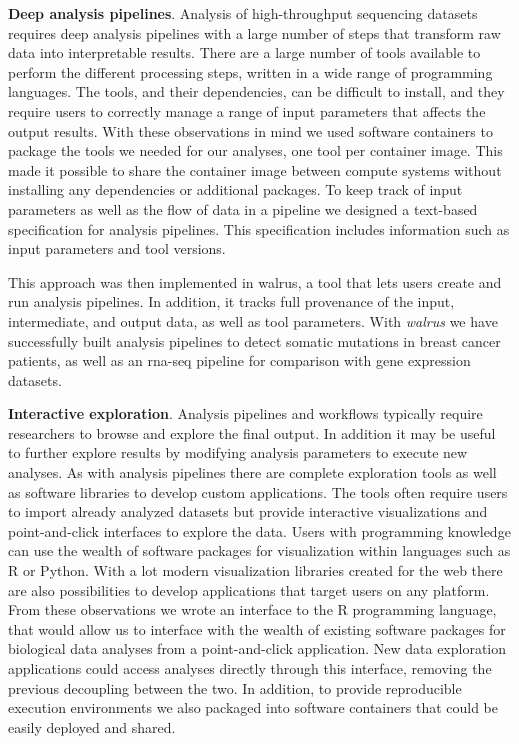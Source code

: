 \textbf{Deep analysis pipelines}. 
Analysis of high-throughput sequencing datasets requires deep analysis pipelines
with a large number of steps that transform raw data into interpretable
results\cite{diao2015building}. There are a large number of tools available to
perform the different processing steps, written in a wide range of programming
languages. The tools, and their dependencies, can be difficult to install, and
they require users to correctly manage a range of input parameters that affects
the output results. With these observations in mind we used software containers
to package the tools we needed for our analyses, one tool per container image.
This made it possible to share the container image between compute systems
without installing any dependencies or additional packages. To keep track of
input parameters as well as the flow of data in a pipeline we designed a
text-based specification for analysis pipelines. This specification includes
information such as input parameters and tool versions. 

This approach was then implemented in walrus, a tool
that lets users create and run analysis pipelines. In addition, it tracks full
provenance of the input, intermediate, and output data, as well as tool
parameters. With \emph{walrus} we have successfully built analysis pipelines to
detect somatic mutations in breast cancer patients, as well as an \gls{rna}-seq
pipeline for comparison with gene expression datasets. 

\textbf{Interactive exploration}. Analysis pipelines and workflows typically
require researchers to browse and explore the final output. In addition it may
be useful to further explore results by modifying analysis parameters to execute
new analyses. As with analysis pipelines there are complete exploration tools as
well as software libraries to develop custom applications. The tools often
require users to import already analyzed datasets but provide interactive
visualizations and point-and-click interfaces to explore the data. Users with
programming knowledge can use the wealth of software packages for visualization
within languages such as R or Python. With a lot modern visualization libraries
created for the web there are also possibilities to develop applications that
target users on any platform. From these observations we wrote an interface to
the R programming language, that would allow us to interface with the wealth of
existing software packages for biological data analyses from a point-and-click
application. New data exploration applications could access analyses directly
through this interface, removing the previous decoupling between the two. In
addition, to provide reproducible execution environments we also packaged into
software containers that could be easily deployed and shared. 

